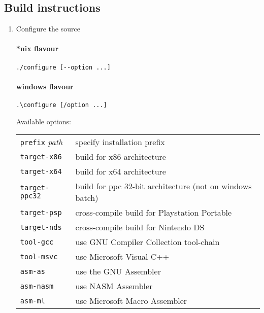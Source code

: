 \pagebreak

\subsection{Build instructions}


\begin{enumerate}
\item Configure the source

\paragraph{*nix flavour}
\begin{lstlisting}
./configure [--option ...]
\end{lstlisting}

\paragraph{windows flavour}

\begin{lstlisting}
.\configure [/option ...]
\end{lstlisting}

Available options:

\begin{tabular}{ll}	
{\tt prefix} {\it path} & specify installation prefix \\
{\tt target-x86}   & build for x86 architecture \\
{\tt target-x64}   & build for x64 architecture \\
{\tt target-ppc32} & build for ppc 32-bit architecture (not on windows batch)\\
{\tt target-psp}   & cross-compile build for Playstation Portable \\
{\tt target-nds}   & cross-compile build for Nintendo DS \\
{\tt tool-gcc}     & use GNU Compiler Collection tool-chain \\
{\tt tool-msvc}    & use Microsoft Visual C++ \\
{\tt asm-as}       & use the GNU Assembler \\
{\tt asm-nasm}     & use NASM Assembler \\
{\tt asm-ml}       & use Microsoft Macro Assembler \\
\end{tabular}


\end{enumerate}
